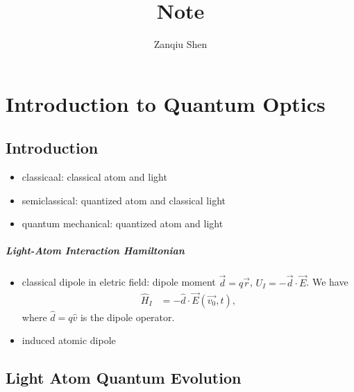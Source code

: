 \documentclass[../../note.tex]{subfiles}
\begin{document}
\title{\textbf{Note}}
\author{Zanqiu Shen}
\maketitle

\chapter{Introduction to Quantum Optics}
\section{Introduction}
\begin{itemize}
    \item classicaal: classical atom and light
    \item semiclassical: quantized atom and classical light
    \item quantum mechanical: quantized atom and light
\end{itemize}

\paragraph{Light-Atom Interaction Hamiltonian}
\begin{itemize}
    \item classical dipole in eletric field: dipole moment $\overrightarrow{d} = q \overrightarrow{r}$, $U_I = - \overrightarrow{d} \cdot \overrightarrow{E}$. We have 
    \begin{align}
        \hat{H}_I 
        &= - \hat{d} \cdot \overrightarrow{E}(\overrightarrow{v_0}, t),
    \end{align}
    where $\hat{d} = q \hat{v}$ is the dipole operator.
    \item induced atomic dipole
\end{itemize}

\section{Light Atom Quantum Evolution}
\end{document}
